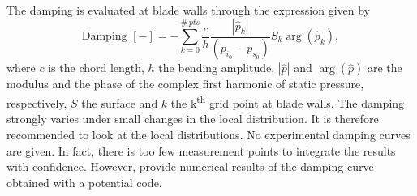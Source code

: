 The damping is evaluated at blade walls through the
expression given by~\citet{Fransson1999}
\begin{equation}
    \textrm{Damping } [-] = - \sum^{\#~pts}_{k=0} \frac{c}{h} 
      \frac{|\widehat{p}_k|}{(p_{i_0} - p_{s_0})} S_k \arg (\widehat{p}_k),
\end{equation}
where $c$ is the chord length,
$h$ the bending amplitude, $| \widehat{p} |$ 
and $\arg (\widehat{p})$ are the modulus and the phase of the
complex first harmonic of static pressure, respectively, $S$ the surface
and $k$ the k\textsuperscript{th}
grid point at blade walls.
The damping strongly varies under small changes in the
local distribution. It is therefore recommended to look at the local
distributions. No experimental damping curves are given. In fact,
there is too few measurement points to integrate the results with
confidence. However, \citet{Fransson1999}
provide numerical results of the damping curve obtained with a potential code.

